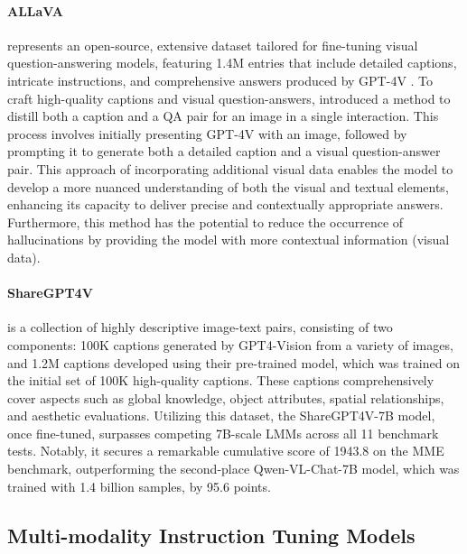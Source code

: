 \documentclass[11pt]{article}
\begin{document}
\paragraph{ALLaVA}\cite{chen2024allava} represents an open-source, extensive dataset tailored for fine-tuning visual question-answering models, featuring 1.4M entries that include detailed captions, intricate instructions, and comprehensive answers produced by GPT-4V \cite{yang2023dawn}. To craft high-quality captions and visual question-answers, \citet{chen2024allava} introduced a method to distill both a caption and a QA pair for an image in a single interaction. This process involves initially presenting GPT-4V \cite{yang2023dawn} with an image, followed by prompting it to generate both a detailed caption and a visual question-answer pair. This approach of incorporating additional visual data enables the model to develop a more nuanced understanding of both the visual and textual elements, enhancing its capacity to deliver precise and contextually appropriate answers. Furthermore, this method has the potential to reduce the occurrence of hallucinations by providing the model with more contextual information (visual data).


\paragraph{ShareGPT4V}\cite{chen2023sharegpt4v} is a collection of highly descriptive image-text pairs, consisting of two components: 100K captions generated by GPT4-Vision \cite{yang2023dawn} from a variety of images, and 1.2M captions developed using their pre-trained model, which was trained on the initial set of 100K high-quality captions. These captions comprehensively cover aspects such as global knowledge, object attributes, spatial relationships, and aesthetic evaluations. Utilizing this dataset, the ShareGPT4V-7B model, once fine-tuned, surpasses competing 7B-scale LMMs across all 11 benchmark tests. Notably, it secures a remarkable cumulative score of 1943.8 on the MME benchmark, outperforming the second-place Qwen-VL-Chat-7B \cite{bai2023qwen} model, which was trained with 1.4 billion samples, by 95.6 points.


\subsection{Multi-modality Instruction Tuning Models}

\end{document}
